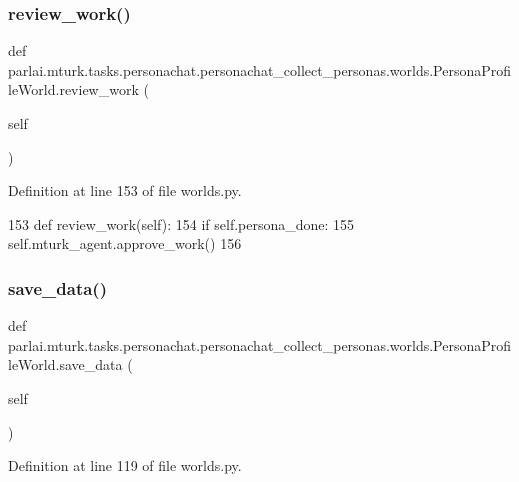 \subsubsection{\texorpdfstring{review\+\_\+work()}{review\_work()}}
{\footnotesize\ttfamily def parlai.\+mturk.\+tasks.\+personachat.\+personachat\+\_\+collect\+\_\+personas.\+worlds.\+Persona\+Profile\+World.\+review\+\_\+work (\begin{DoxyParamCaption}\item[{}]{self }\end{DoxyParamCaption})}



Definition at line 153 of file worlds.\+py.


\begin{DoxyCode}
153     \textcolor{keyword}{def }review\_work(self):
154         \textcolor{keywordflow}{if} self.persona\_done:
155             self.mturk\_agent.approve\_work()
156 
\end{DoxyCode}
\mbox{\label{classparlai_1_1mturk_1_1tasks_1_1personachat_1_1personachat__collect__personas_1_1worlds_1_1PersonaProfileWorld_afb7beff8437dadf18a1e39d16f21eec8}} 
\subsubsection{\texorpdfstring{save\+\_\+data()}{save\_data()}}
{\footnotesize\ttfamily def parlai.\+mturk.\+tasks.\+personachat.\+personachat\+\_\+collect\+\_\+personas.\+worlds.\+Persona\+Profile\+World.\+save\+\_\+data (\begin{DoxyParamCaption}\item[{}]{self }\end{DoxyParamCaption})}



Definition at line 119 of file worlds.\+py.


